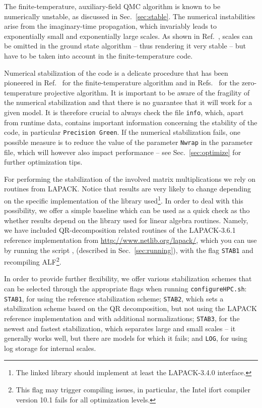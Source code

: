 
The finite-temperature, auxiliary-field QMC algorithm is known to be numerically unstable, as discussed in Sec.~\ref{sec:stable}.
The numerical instabilities arise from the imaginary-time propagation, which invariably leads to exponentially small and exponentially large scales.
As shown in Ref.~\cite{Assaad08_rev}, scales can be omitted in the ground state algorithm -- thus rendering it very stable --  but have to be taken into account in the  finite-temperature code.

Numerical stabilization of the code is a delicate procedure that has been pioneered in Ref.~\cite{White89}  for the finite-temperature algorithm and in Refs.~\cite{Sugiyama86,Sorella89} for the zero-temperature projective algorithm.
It is important to be aware of the fragility of the numerical stabilization and that there is no guarantee that it will work for a given model. It is therefore crucial to always check the file \texttt{info}, which, apart from runtime data, contains important information concerning the stability of the code, in particular \texttt{Precision Green}.
If the numerical stabilization fails, one possible measure is to reduce the value of the parameter \texttt{Nwrap} in the parameter file, which will however also impact performance -- see Sec.~\ref{sec:optimize} for further optimization tips.

For performing the stabilization of the involved matrix multiplications we rely on routines from LAPACK. Notice that results are very likely to change
depending on the specific implementation of the library used\footnote{The linked library should implement at least the LAPACK-3.4.0 interface.}.
In order to deal with this possibility, we offer a simple baseline which can be used as a quick check as tho whether results depend on the library used for linear algebra routines. Namely, we have included QR-decomposition related routines of the LAPACK-3.6.1 reference implementation from \url{http://www.netlib.org/lapack/}, which you can use by 
running the script , (described in Sec.~\ref{sec:running}), with the flag \texttt{STAB1} and recompiling ALF\footnote{This flag may trigger compiling issues, in particular, the Intel ifort compiler version 10.1 fails for all optimization levels.}.

In order to provide further flexibility, we offer various stabilization schemes that can be selected through the appropriate flags when running \texttt{configureHPC.sh}:  \texttt{STAB1}, for using the reference stabilization scheme;
\texttt{STAB2}, which sets a stabilization scheme based on the QR decomposition, but not using the LAPACK reference implementation and with additional normalizations;
\texttt{STAB3}, for the newest and fastest stabilization, which separates large and small scales -- it generally works well, but there are models for which it fails;
and \texttt{LOG}, for using log storage for internal scales.

